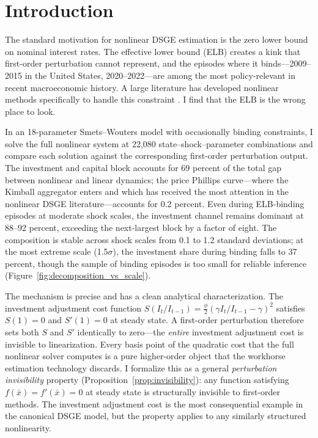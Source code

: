 \documentclass[12pt]{article}
\theoremstyle{plain}
\theoremstyle{definition}
\theoremstyle{remark}
\begin{document}
\section{Introduction}
\label{sec:introduction}

The standard motivation for nonlinear DSGE estimation is the zero lower bound on nominal interest rates. The effective lower bound (ELB) creates a kink that first-order perturbation cannot represent, and the episodes where it binds---2009--2015 in the United States, 2020--2022---are among the most policy-relevant in recent macroeconomic history. A large literature has developed nonlinear methods specifically to handle this constraint \citep{gust2012effects,boehl2022monetary,guerrieri2015occbin}. I find that the ELB is the wrong place to look.

In an 18-parameter Smets--Wouters model with occasionally binding constraints, I solve the full nonlinear system at 22,080 state--shock--parameter combinations and compare each solution against the corresponding first-order perturbation output. The investment and capital block accounts for 69 percent of the total gap between nonlinear and linear dynamics; the price Phillips curve---where the Kimball aggregator enters and which has received the most attention in the nonlinear DSGE literature---accounts for 0.2 percent. Even during ELB-binding episodes at moderate shock scales, the investment channel remains dominant at 88--92 percent, exceeding the next-largest block by a factor of eight. The composition is stable across shock scales from 0.1 to 1.2 standard deviations; at the most extreme scale (1.5$\sigma$), the investment share during binding falls to 37 percent, though the sample of binding episodes is too small for reliable inference (Figure~\ref{fig:decomposition_vs_scale}).

The mechanism is precise and has a clean analytical characterization. The investment adjustment cost function $S(I_t/I_{t-1}) = \tfrac{\phi}{2}(\gamma I_t/I_{t-1} - \gamma)^2$ satisfies $S(1) = 0$ and $S'(1) = 0$ at steady state. A first-order perturbation therefore sets both $S$ and $S'$ identically to zero---the \emph{entire} investment adjustment cost is invisible to linearization. Every basis point of the quadratic cost that the full nonlinear solver computes is a pure higher-order object that the workhorse estimation technology discards. I formalize this as a general \textit{perturbation invisibility} property (Proposition~\ref{prop:invisibility}): any function satisfying $f(\bar{x}) = f'(\bar{x}) = 0$ at steady state is structurally invisible to first-order methods. The investment adjustment cost is the most consequential example in the canonical DSGE model, but the property applies to any similarly structured nonlinearity.
\end{document}
